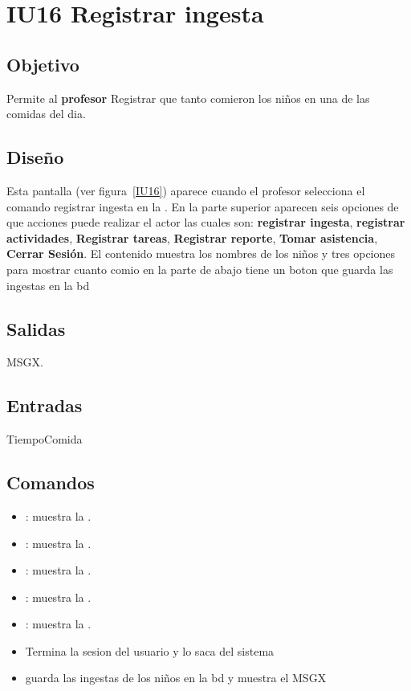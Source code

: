 \newpage
\section{IU16 Registrar ingesta}

\subsection{Objetivo}
	Permite al {\bf profesor} Registrar que tanto comieron los niños en una de las comidas del dia.

\subsection{Diseño}
	Esta pantalla  (ver figura~\ref{IU16}) aparece cuando el profesor selecciona el comando registrar ingesta en la . 
 En la parte superior aparecen seis opciones de que acciones puede realizar el actor las cuales son: {\bf registrar ingesta}, {\bf registrar actividades}, {\bf Registrar tareas}, {\bf Registrar reporte}, {\bf Tomar asistencia}, {\bf Cerrar Sesión}. 
 El contenido muestra los nombres de los niños y tres opciones para mostrar cuanto comio
 en la parte de abajo tiene un boton que guarda las ingestas en la bd
 

\subsection{Salidas}

	MSGX.

\subsection{Entradas}
TiempoComida

\subsection{Comandos}
\begin{itemize}
	\item {}: muestra la .
        \item {}: muestra la .
        \item {}: muestra la .
        \item {}: muestra la .
        \item {}: muestra la .
        \item {}Termina la sesion del usuario y lo saca del sistema
        \item {} guarda las ingestas de los niños en la bd y muestra el MSGX
\end{itemize}


